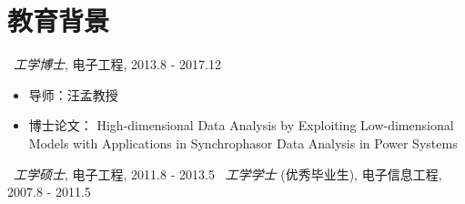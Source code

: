 \documentclass{resume}
\begin{document}


 

\section{教育背景}
\ \textit{工学博士}, 电子工程, {2013.8 - 2017.12}
\begin{itemize}
	\item 导师：汪孟教授
	\item  博士论文： High-dimensional Data Analysis by Exploiting Low-dimensional Models with Applications in Synchrophasor Data Analysis in Power Systems
\end{itemize}
\ \textit{工学硕士}, 电子工程, {2011.8 - 2013.5}
\ \textit{工学学士} (优秀毕业生), 电子信息工程, {2007.8 - 2011.5}

\end{document}
